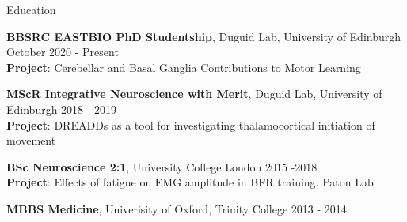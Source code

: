 \documentclass{resume} %
\begin{document}

\begin{rSection}{Education}

{\bf BBSRC EASTBIO PhD Studentship}, Duguid Lab, University of Edinburgh \hfill {October 2020 - Present}\\
{\bf Project}: Cerebellar and Basal Ganglia Contributions to Motor Learning

{\bf MScR Integrative Neuroscience with Merit}, Duguid Lab, University of Edinburgh \hfill {2018 - 2019}\\
{\bf Project}: DREADDs as a tool for investigating thalamocortical initiation of movement

{\bf BSc Neuroscience 2:1}, University College London \hfill {2015 -2018}\\
{\bf Project}: Effects of fatigue on EMG amplitude in BFR training. Paton Lab

{\bf MBBS Medicine}, Univerisity of Oxford, Trinity College \hfill{2013 - 2014}\\



\end{rSection}
\end{document}
